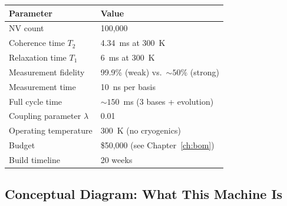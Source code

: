 \documentclass[11pt,a4paper,openany]{book}
\begin{document}
\begin{center}
\begin{tabular}{ll}
\toprule
\textbf{Parameter} & \textbf{Value} \\
\midrule
NV count & 100,000 \\
Coherence time $T_2$ & 4.34~ms at 300~K \\
Relaxation time $T_1$ & 6~ms at 300~K \\
Measurement fidelity & 99.9\% (weak) vs.\ ${\sim}50\%$ (strong) \\
Measurement time & 10~ns per basis \\
Full cycle time & ${\sim}150$~ms (3 bases + evolution) \\
Coupling parameter $\lambda$ & 0.01 \\
Operating temperature & 300~K (no cryogenics) \\
Budget & \$50,000 (see Chapter~\ref{ch:bom}) \\
Build timeline & 20 weeks \\
\bottomrule
\end{tabular}
\end{center}

\subsection{Conceptual Diagram: What This Machine Is}
\end{document}
